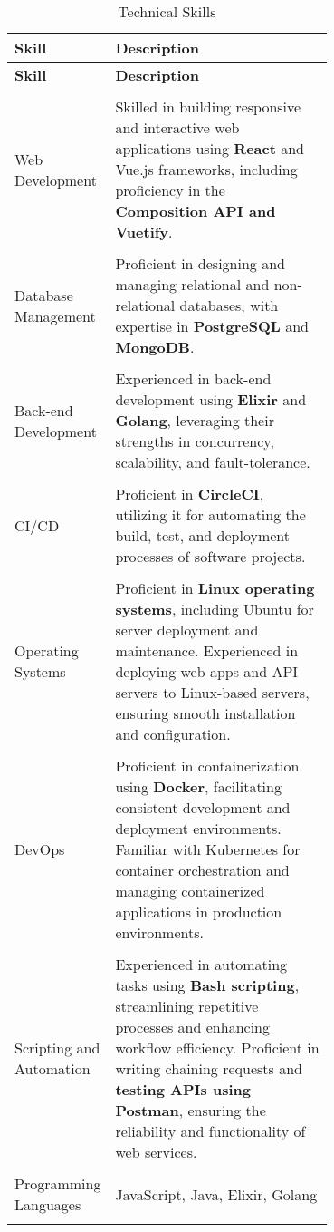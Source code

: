 \documentclass{resume} %
\newcommand{\entry}[2]{#1 & #2 \tabularnewline} %
\begin{document}
\begin{longtable}{lp{0.7\linewidth}}
    \caption{Technical Skills} \\
    \hline
    \textbf{Skill} & \textbf{Description} \\
    \hline
    \endfirsthead
    
    \hline
    \textbf{Skill} & \textbf{Description} \\
    \hline
    \endhead

    \multicolumn{2}{c}{\rule{0pt}{10pt}} \\
    
    \entry{Web Development}{Skilled in building responsive and interactive web applications using \textbf{React} and Vue.js frameworks, including proficiency in the \textbf{Composition API and Vuetify}.} \\
    \entry{Database Management}{Proficient in designing and managing relational and non-relational databases, with expertise in \textbf{PostgreSQL} and \textbf{MongoDB}.} \\
    \entry{Back-end Development}{Experienced in back-end development using \textbf{Elixir} and \textbf{Golang}, leveraging their strengths in concurrency, scalability, and fault-tolerance.} \\
    \entry{CI/CD}{Proficient in \textbf{CircleCI}, utilizing it for automating the build, test, and deployment processes of software projects.} \\
    \entry{Operating Systems}{Proficient in \textbf{Linux operating systems}, including Ubuntu for server deployment and maintenance. Experienced in deploying web apps and API servers to Linux-based servers, ensuring smooth installation and configuration.} \\
    \entry{DevOps}{Proficient in containerization using \textbf{Docker}, facilitating consistent development and deployment environments. Familiar with Kubernetes for container orchestration and managing containerized applications in production environments.} \\
    \entry{Scripting and Automation}{Experienced in automating tasks using \textbf{Bash scripting}, streamlining repetitive processes and enhancing workflow efficiency. Proficient in writing chaining requests and \textbf{testing APIs using Postman}, ensuring the reliability and functionality of web services.} \\
    \entry{Programming Languages}{JavaScript, Java, Elixir, Golang} \\
\end{longtable}
\end{document}
